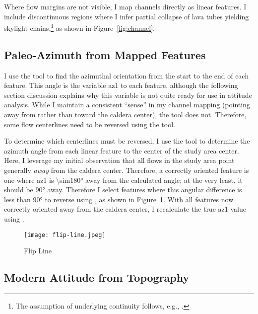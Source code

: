 Where flow margins are not visible, I map channels directly as linear features. I include discontinuous regions where I infer partial collapse of lava tubes yielding skylight chains,\footnote{The assumption of underlying continuity follows, e.g., \textcite{bleacher_olympus_2007,carr_geologic_2010,peters_lava_2021}.} as shown in Figure~\ref{fig:channel}.

\subsection{Paleo-Azimuth from Mapped Features}


I use the  tool to find the azimuthal orientation from the start to the end of each feature. This angle is the variable \ac{az1} to each feature, although the following section discussion explains why this variable is not quite ready for use in attitude analysis. While I maintain a consistent ``sense'' in my channel mapping (pointing away from rather than toward the caldera center), the  tool does not. Therefore, some flow centerlines need to be reversed using the  tool.

To determine which centerlines must be reversed, I use the  tool to determine the azimuth angle from each linear feature to the center of the study area \acs{center}. Here, I leverage my initial observation that all flows in the study area point generally \emph{away} from the caldera center. Therefore, a correctly oriented feature is one where \acs{az1} is \ang{\sim180} away from the calculated angle; at the very least, it should be \ang{90} away. Therefore I select features where this angular difference is less than \ang{90} to reverse using , as shown in Figure~\ref{fig:flip-line}. With all features now correctly oriented away from the caldera center, I recalculate the true \ac{az1} value using .

\begin{figure}
    \texttt{[image: flip-line.jpeg]}%
    \caption{Flip Line}%
    \label{fig:flip-line}
\end{figure}

\subsection{Modern Attitude from Topography}


